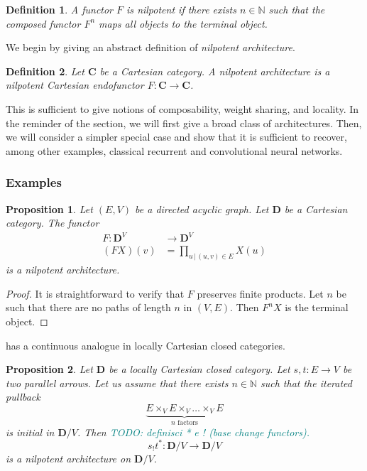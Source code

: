 \documentclass[12pt]{article}
\newtheorem{definition}{Definition}
\newtheorem{proposition}{Proposition}
\newcommand{\pietro}[1]{\textcolor{teal}{#1}}
\newcommand{\N}{{\mathbb{N}}}
\newcommand{\Cat}{{\mathbf{C}}}
\newcommand{\DCat}{{\mathbf{D}}}
\begin{document}
\begin{definition}\label{def:nilpotent_functor}
    A functor $F$ is {\em nilpotent} if there exists $n \in \N$ such that the composed functor $F^n$ maps all objects to the terminal object.
\end{definition}

We begin by giving an abstract definition of {\em nilpotent architecture}.

\begin{definition}\label{def:nilpotent_architecture}
    Let $\Cat$ be a Cartesian category. A {\em nilpotent architecture} is a nilpotent Cartesian endofunctor $F \colon \Cat \rightarrow \Cat$.
\end{definition}

This is sufficient to give notions of composability, weight sharing, and locality. In the reminder of the section, we will first give a broad class of architectures. Then, we will consider a simpler special case and show that it is sufficient to recover, among other examples, classical recurrent and convolutional neural networks.

\subsubsection*{Examples}

\begin{proposition}\label{prop:graph_architecture}
    Let $(E, V)$ be a directed acyclic graph. Let $\DCat$ be a Cartesian category. The functor
    \begin{align*}
        F \colon \DCat^V & \rightarrow \DCat^V                  \\
        (F X)(v)         & = \prod_{u \, | \, (u, v)\in E} X(u)
    \end{align*}
    is a nilpotent architecture.
\end{proposition}

\begin{proof}
    It is straightforward to verify that $F$ preserves finite products. Let $n$ be such that there are no paths of length $n$ in $(V, E)$. Then $F^n X$ is the terminal object.
\end{proof}

 has a continuous analogue in locally Cartesian closed categories.
\begin{proposition}\label{[prop]:categorical_architecture}
    Let $\DCat$ be a locally Cartesian closed category. Let $s, t\colon E \rightarrow V$ be two parallel arrows. Let us assume that there exists $n \in \N$ such that the iterated pullback
    \begin{equation}\label{eq:nilpotent_left_adjoint}
        \underbrace{E \times_V E \times_V \dots \times_V E}_{n \text{ factors}}
    \end{equation}
    is initial in $\DCat/V$.
    Then \pietro{TODO: definisci * e ! (base change functors).}
    \begin{equation*}
        s_!t^*\colon \DCat/V \rightarrow \DCat/V
    \end{equation*}
    is a nilpotent architecture on $\DCat/V$.
\end{proposition}
\end{document}
